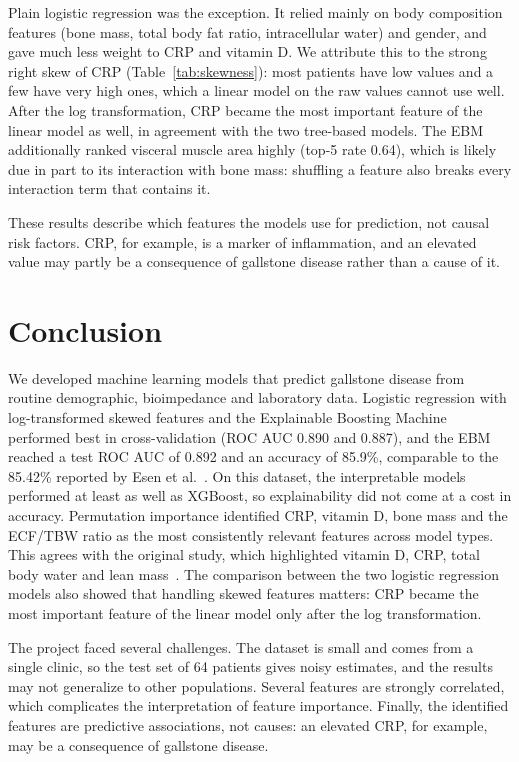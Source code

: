 \documentclass[conference]{IEEEtran}
\begin{document}
Plain logistic regression was the exception. It relied mainly on body
composition features (bone mass, total body fat ratio, intracellular water) and
gender, and gave much less weight to CRP and vitamin D. We attribute this to
the strong right skew of CRP (Table~\ref{tab:skewness}): most patients have low
values and a few have very high ones, which a linear model on the raw values
cannot use well. After the log transformation, CRP became the most important
feature of the linear model as well, in agreement with the two tree-based
models. The EBM additionally ranked visceral muscle area highly (top-5 rate
0.64), which is likely due in part to its interaction with bone mass: shuffling
a feature also breaks every interaction term that contains it.

These results describe which features the models use for prediction, not
causal risk factors. CRP, for example, is a marker of inflammation, and an
elevated value may partly be a consequence of gallstone disease rather than a
cause of it.

\section{Conclusion}
\label{sec:conclusion}

We developed machine learning models that predict gallstone disease from
routine demographic, bioimpedance and laboratory data. Logistic regression with
log-transformed skewed features and the Explainable Boosting Machine performed
best in cross-validation (ROC AUC 0.890 and 0.887), and the EBM reached a test
ROC AUC of 0.892 and an accuracy of 85.9\%, comparable to the 85.42\% reported
by Esen et al.~\cite{esen2024gallstone}. On this dataset, the interpretable
models performed at least as well as XGBoost, so explainability did not come at
a cost in accuracy. Permutation importance identified CRP, vitamin D, bone mass
and the ECF/TBW ratio as the most consistently relevant features across model
types. This agrees with the original study, which highlighted vitamin D, CRP,
total body water and lean mass~\cite{esen2024gallstone}. The comparison between
the two logistic regression models also showed that handling skewed features
matters: CRP became the most important feature of the linear model only after
the log transformation.

The project faced several challenges. The dataset is small and comes from a
single clinic, so the test set of 64 patients gives noisy estimates, and the
results may not generalize to other populations. Several features are strongly
correlated, which complicates the interpretation of feature importance. Finally, the
identified features are predictive associations, not causes: an elevated CRP,
for example, may be a consequence of gallstone disease.
\end{document}
